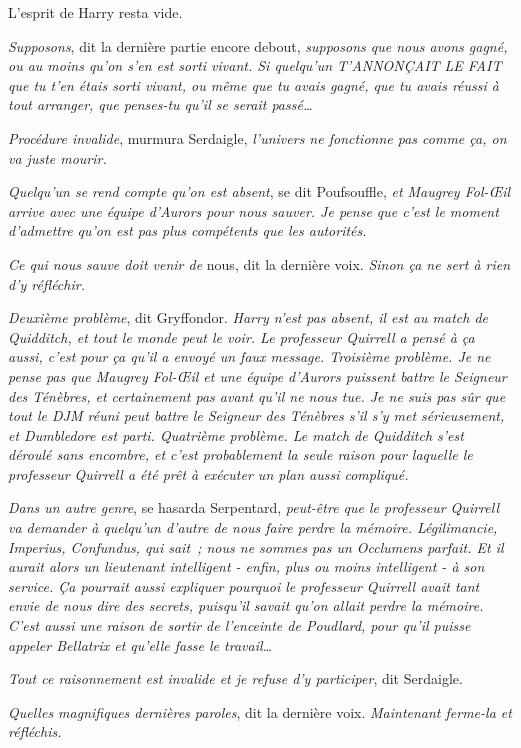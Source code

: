 L'esprit de Harry resta vide.

\emph{Supposons}, dit la dernière partie encore debout, \emph{supposons que nous avons gagné, ou au moins qu'on s'en est sorti vivant. Si quelqu'un T'ANNONÇAIT LE FAIT que tu t'en étais sorti vivant, ou même que tu avais gagné, que tu avais réussi à tout arranger, que penses-tu qu'il se serait passé…}

\emph{Procédure invalide}, murmura Serdaigle, \emph{l'univers ne fonctionne pas comme ça, on va juste mourir.}

\emph{Quelqu'un se rend compte qu'on est absent}, se dit Poufsouffle, \emph{et Maugrey Fol-Œil arrive avec une équipe d'Aurors pour nous sauver. Je pense que c'est le moment d'admettre qu'on est pas plus compétents que les autorités.}

\emph{Ce qui nous sauve doit venir de} nous, dit la dernière voix. \emph{Sinon ça ne sert à rien d'y réfléchir.}

\emph{Deuxième problème}, dit Gryffondor. \emph{Harry n'est pas absent, il est au match de Quidditch, et tout le monde peut le voir. Le professeur Quirrell a pensé à ça aussi, c'est pour ça qu'il a envoyé un faux message. Troisième problème. Je ne pense pas que Maugrey Fol-Œil et une équipe d'Aurors puissent battre le Seigneur des Ténèbres, et certainement pas avant qu'il ne nous tue. Je ne suis pas sûr que tout le DJM réuni peut battre le Seigneur des Ténèbres s'il s'y met sérieusement, et Dumbledore est parti. Quatrième problème. Le match de Quidditch s'est déroulé sans encombre, et c'est probablement la seule raison pour laquelle le professeur Quirrell a été prêt à exécuter un plan aussi compliqué.}

\emph{Dans un autre genre}, se hasarda Serpentard, \emph{peut-être que le professeur Quirrell va demander à quelqu'un d'autre de nous faire perdre la mémoire. Légilimancie, Imperius, Confundus, qui sait~; nous ne sommes pas un Occlumens parfait. Et il aurait alors un lieutenant intelligent - enfin, plus ou moins intelligent - à son service. Ça pourrait aussi expliquer pourquoi le professeur Quirrell avait tant envie de nous dire des secrets, puisqu'il savait qu'on allait perdre la mémoire. C'est aussi une raison de sortir de l'enceinte de Poudlard, pour qu'il puisse appeler Bellatrix et qu'elle fasse le travail…}

\emph{Tout ce raisonnement est invalide et je refuse d'y participer}, dit Serdaigle.

\emph{Quelles magnifiques dernières paroles}, dit la dernière voix. \emph{Maintenant ferme-la et réfléchis.}

